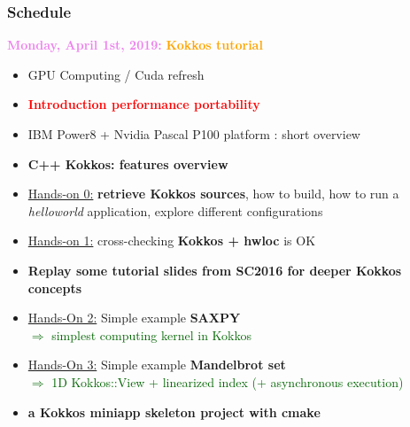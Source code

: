 \begin{frame}
  \frametitle{Schedule}

  {\bf \large \textcolor{violet}{Monday, April 1st, 2019:}} \textcolor{orange}{\bf Kokkos tutorial}
  \begin{itemize}
  \item GPU Computing / Cuda refresh %
  \item \textcolor{red}{\bf Introduction performance portability} %
  \item IBM Power8 + Nvidia Pascal P100 platform : short overview %
  \item \textbf{C++ Kokkos: features overview} %
  \item \textcolor{blue}{\hyperlink{handson0}{Hands-on 0:}} \textbf{retrieve Kokkos sources}, how to build, how to run a \textit{helloworld} application, explore different configurations %
  \item \textcolor{blue}{\hyperlink{handson1}{Hands-on 1:}} cross-checking \textbf{Kokkos + hwloc} is OK
  \item \textbf{Replay some tutorial slides from SC2016 for deeper Kokkos concepts}
  \item \textcolor{blue}{\hyperlink{handson2}{Hands-On 2:}} Simple example \textbf{SAXPY}\\
    \textcolor{darkgreen}{$\Rightarrow$ simplest computing kernel in Kokkos} %
  \item \textcolor{blue}{\hyperlink{handson3}{Hands-On 3:}} Simple example \textbf{Mandelbrot set}\\
    \textcolor{darkgreen}{$\Rightarrow$ 1D Kokkos::View + linearized index (+ asynchronous execution)} %
  \item {\bf a Kokkos miniapp skeleton project with cmake} 
  \end{itemize}
\end{frame}

